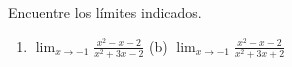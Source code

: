 \item Encuentre los límites indicados.
\begin{enumerate}
    \item[(a)] $\displaystyle \lim_{x \to -1} \frac{x^2-x-2}{x^2+3x-2}$ \quad (b) $\displaystyle \lim_{x \to -1} \frac{x^2-x-2}{x^2+3x+2}$
\end{enumerate}
